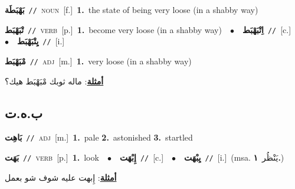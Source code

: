 \documentclass[10pt,a4paper,twoside]{article} %
\begin{document}
\begin{multicols}{2}
{\setlength\topsep{0pt}\textbf{\foreignlanguage{arabic}{بَهْبَطَة}}\ {\color{gray}\texttt{//}\color{black}}\ \textsc{noun}\ [f.]\ \textbf{1.}~the state of being very loose (in a shabby way)\ } \vspace{2mm}

{\setlength\topsep{0pt}\textbf{\foreignlanguage{arabic}{تْبَهْبَط}}\ {\color{gray}\texttt{//}\color{black}}\ \textsc{verb}\ [p.]\ \textbf{1.}~become very loose (in a shabby way)\ \ $\bullet$\ \ \setlength\topsep{0pt}\textbf{\foreignlanguage{arabic}{اِتْبَهْبَط}}\ {\color{gray}\texttt{//}\color{black}}\ [c.]\ \ $\bullet$\ \ \setlength\topsep{0pt}\textbf{\foreignlanguage{arabic}{يِتْبَهْبَط}}\ {\color{gray}\texttt{//}\color{black}}\ [i.]\ } \vspace{2mm}

{\setlength\topsep{0pt}\textbf{\foreignlanguage{arabic}{مْبَهْبَط}}\ {\color{gray}\texttt{//}\color{black}}\ \textsc{adj}\ [m.]\ \textbf{1.}~very loose (in a shabby way)\  \begin{flushright}\color{gray}\foreignlanguage{arabic}{\textbf{\underline{\foreignlanguage{arabic}{أمثلة}}}: ماله ثوبك مْبَهْبَط هيك؟}\end{flushright}\color{black}} \vspace{2mm}

\vspace{-3mm}
\subsection*{\color{blue}\foreignlanguage{arabic}{ب.ه.ت}\color{blue}{}} 

{\setlength\topsep{0pt}\textbf{\foreignlanguage{arabic}{بَاهِت}}\ {\color{gray}\texttt{//}\color{black}}\ \textsc{adj}\ [m.]\ \textbf{1.}~pale  \textbf{2.}~astonished  \textbf{3.}~startled\ } \vspace{2mm}

{\setlength\topsep{0pt}\textbf{\foreignlanguage{arabic}{بَهَت}}\ {\color{gray}\texttt{//}\color{black}}\ \textsc{verb}\ [p.]\ \textbf{1.}~look\ \ $\bullet$\ \ \setlength\topsep{0pt}\textbf{\foreignlanguage{arabic}{إِبْهَت}}\ {\color{gray}\texttt{//}\color{black}}\ [c.]\ \ $\bullet$\ \ \setlength\topsep{0pt}\textbf{\foreignlanguage{arabic}{يِبْهَت}}\ {\color{gray}\texttt{//}\color{black}}\ [i.]\ \color{gray}(msa. \foreignlanguage{arabic}{يَنْظُر}~\foreignlanguage{arabic}{\textbf{١.}})\color{black}\  \begin{flushright}\color{gray}\foreignlanguage{arabic}{\textbf{\underline{\foreignlanguage{arabic}{أمثلة}}}: إِبهت عليه شوف شو بعمل}\end{flushright}\color{black}} \vspace{2mm}


\end{multicols}
\end{document}
